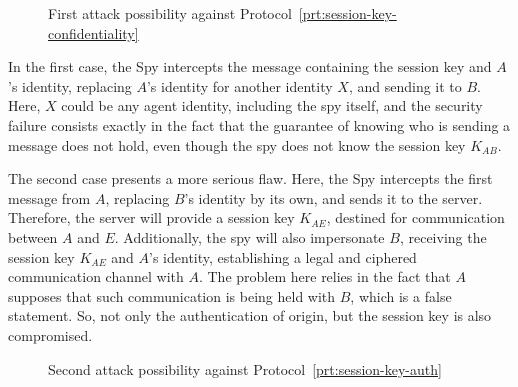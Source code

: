 \begin{figure}[ht]
  \centering
  \caption{First attack possibility against Protocol~\ref{prt:session-key-confidentiality}}
  \label{fig:auth-attack1}
\end{figure}

In the first case, the Spy intercepts the message containing the session key and \(A\)'s identity, replacing \(A\)'s identity for another identity \(X\), and sending it to \(B\). Here, \(X\) could be any agent identity, including the spy itself, and the security failure consists exactly in the fact that the guarantee of knowing who is sending a message does not hold, even though the spy does not know the session key \(K_{AB}\).

The second case presents a more serious flaw. Here, the Spy intercepts the first message from \(A\), replacing \(B\)'s identity by its own, and sends it to the server. Therefore, the server will provide a session key \(K_{AE}\), destined for communication between \(A\) and \(E\). Additionally, the spy will also impersonate \(B\), receiving the session key \(K_{AE}\) and \(A\)'s identity, establishing a legal and ciphered communication channel with \(A\). The problem here relies in the fact that \(A\) supposes that such communication is being held with \(B\), which is a false statement. So, not only the authentication of origin, but the session key is also compromised.

\begin{figure}[ht]\label{fig:auth-attack2}
  \centering

  \caption{Second attack possibility against Protocol~\ref{prt:session-key-auth}}
\end{figure}

